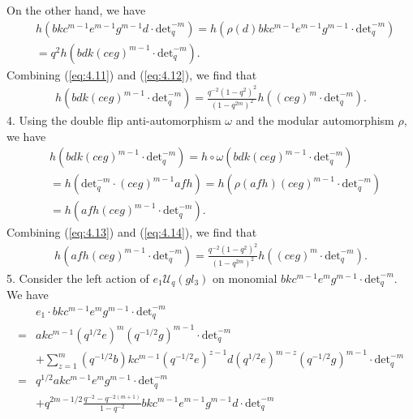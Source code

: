 \documentclass[table,a4paper,reqno]{amsart}
\numberwithin{equation}{section}
\theoremstyle{definition}
\begin{document}
On the other hand, we have
\begin{equation}\label{eq:4.12}
\begin{split}
    &h(bkc^{m-1}e^{m-1}g^{m-1}d\cdot\text{det}_q^{-m})=h(\rho(d)bkc^{m-1}e^{m-1}g^{m-1}\cdot\text{det}_q^{-m})\\
    &=q^2h(bdk(ceg)^{m-1}\cdot\text{det}_q^{-m}).
\end{split}
\end{equation}
Combining (\ref{eq:4.11}) and (\ref{eq:4.12}), we find that
\begin{equation}\label{eq:4.13}
    \begin{split}
        h(bdk(ceg)^{m-1}\cdot\text{det}_q^{-m})=\frac{q^{-2}(1-q^2)^2}{(1-q^{2m})^2}h((ceg)^m\cdot\text{det}_q^{-m}).
    \end{split}
\end{equation}
4. Using the double flip anti-automorphism $\omega$ and the modular automorphism $\rho$, we have
\begin{equation}\label{eq:4.14}
    \begin{split}
        &h(bdk(ceg)^{m-1}\cdot\text{det}_q^{-m})=h\circ\omega(bdk(ceg)^{m-1}\cdot\text{det}_q^{-m})\\
        &=h(\text{det}_q^{-m}\cdot(ceg)^{m-1}afh)=h(\rho(afh)(ceg)^{m-1}\cdot\text{det}_q^{-m})\\
        &=h(afh(ceg)^{m-1}\cdot\text{det}_q^{-m}).
    \end{split}
\end{equation}
Combining (\ref{eq:4.13}) and (\ref{eq:4.14}), we find that 
\begin{equation}\label{eq:4.15}
    \begin{split}
        h(afh(ceg)^{m-1}\cdot\text{det}_q^{-m})=\frac{q^{-2}(1-q^2)^2}{(1-q^{2m})^2}h((ceg)^m\cdot\text{det}_q^{-m}).
    \end{split}
\end{equation}
5. Consider the left action of  $e_1\mathcal{U}_q(gl_3)$ on monomial $bkc^{m-1}e^{m}g^{m-1}\cdot\text{det}_q^{-m}$. We have
\begin{equation}\label{eq:4.16}
    \begin{split}
        &e_1\cdot bkc^{m-1}e^{m}g^{m-1}\cdot\text{det}_q^{-m}\\
        =&akc^{m-1}(q^{1/2}e)^{m}(q^{-1/2}g)^{m-1}\cdot\text{det}_q^{-m}\\
        &+\sum_{z=1}^m(q^{-1/2}b)kc^{m-1}(q^{-1/2}e)^{z-1}d(q^{1/2}e)^{m-z}(q^{-1/2}g)^{m-1}\cdot\text{det}_q^{-m}\\
        =&q^{1/2}akc^{m-1}e^{m}g^{m-1}\cdot\text{det}_q^{-m}\\
        &+q^{2m-1/2}\frac{q^{-2}-q^{-2(m+1)}}{1-q^{-2}}bkc^{m-1}e^{m-1}g^{m-1}d\cdot\text{det}_q^{-m}\\
    \end{split}
\end{equation}
\end{document}
